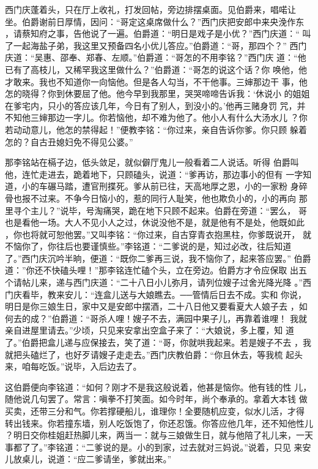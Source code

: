 西门庆蓬着头，只在厅上收礼，打发回帖，旁边排摆桌面。见伯爵来，唱喏让
坐。伯爵谢前日厚情，因问：“哥定这桌席做什么？”西门庆把安郎中来央浼作东
，请蔡知府之事，告他说了一遍。伯爵道：“明日是戏子是小优？”西门庆道：“
叫了一起海盐子弟，我这里又预备四名小优儿答应。”伯爵道：“哥，那四个？”
西门庆道：“吴惠、邵奉、郑春、左顺。”伯爵道：“哥怎的不用李铭？”西门庆
道：“他已有了高枝儿，又稀罕我这里做什么？”伯爵道：“哥怎的说这个话？你
唤他，他才敢来。我也不知道你一向恼他。但是各人勾当，不干他事。三婶那边干
事，他怎的晓得？你到休要屈了他。他今早到我那里，哭哭啼啼告诉我：‘休说小
的姐姐在爹宅内，只小的答应该几年，今日有了别人，到没小的。’他再三赌身罚
咒，并不知他三婶那边一字儿。你若恼他，却不难为他了。他小人有什么大汤水儿
？你若动动意儿，他怎的禁得起！”便教李铭：“你过来，亲自告诉你爹。你只顾
躲着怎的？自古丑媳妇免不得见公婆。”

那李铭站在槅子边，低头敛足，就似僻厅鬼儿一般看着二人说话。听得
伯爵叫他，连忙走进去，跪着地下，只顾磕头，说道：“爹再访，那边事小的但有
一字知道，小的车碾马踏，遭官刑揲死。爹从前已往，天高地厚之恩，小的一家粉
身碎骨也报不过来。不争今日恼小的，惹的同行人耻笑，他也欺负小的，小的再向
那里寻个主儿？”说毕，号淘痛哭，跪在地下只顾不起来。伯爵在旁道：“罢么，
哥也是看他一场。大人不见小人之过，休说没他不是，就是他有不是处，他既如此
，你也将就可恕他罢。”又叫李铭：“你过来，自古穿青衣抱黑柱，你爹既说开，
就不恼你了，你往后也要谨慎些。”李铭道：“二爹说的是，知过必改，往后知道
了。”西门庆沉吟半晌，便道：“既你二爹再三说，我不恼你了，起来答应罢。”
伯爵道：”你还不快磕头哩！”那李铭连忙磕个头，立在旁边。伯爵方才令应保取
出五个请帖儿来，递与西门庆道：“二十八日小儿弥月，请列位嫂子过舍光降光降
。”西门庆看毕，教来安儿：“连盒儿送与大娘瞧去。──管情后日去不成。实和
你说，明日是你三娘生日，家中又是安郎中摆酒，二十八日他又要看夏大人娘子去
，如何去的成？”伯爵道：“哥杀人哩！嫂子不去，满园中果子儿，再靠着谁哩！
我就亲自进屋里请去。”少顷，只见来安拿出空盒子来了：“大娘说，多上覆，知
道了。”伯爵把盒儿递与应保接去，笑了道：“哥，你就哄我起来。若是嫂子不去
，我就把头磕烂了，也好歹请嫂子走走去。”西门庆教伯爵：“你且休去，等我梳
起头来，咱每吃饭。”说毕，入后边去了。

这伯爵便向李铭道：“如何？刚才不是我这般说着，他甚是恼你。他有钱的性
儿，随他说几句罢了。常言：嗔拳不打笑面。如今时年，尚个奉承的。拿着大本钱
做买卖，还带三分和气。你若撑硬船儿，谁理你！全要随机应变，似水儿活，才得
转出钱来。你若撞东墙，别人吃饭饱了，你还忍饿。你答应他几年，还不知他性儿
？明日交你桂姐赶热脚儿来，两当一：就与三娘做生日，就与他陪了礼儿来，一天
事都了了。”李铭道：“二爹说的是。小的到家，过去就对三妈说。”说着，只见
来安儿放桌儿，说道：“应二爹请坐，爹就出来。”

